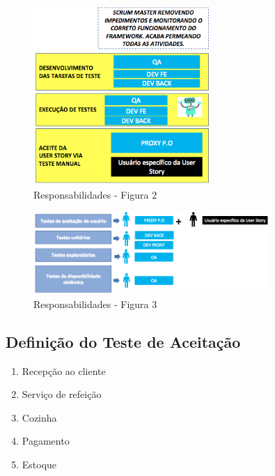 \begin{figure}[H]
  \centering
  \includegraphics[width=0.6\textwidth]{softwareengineer/images/responsibilities-2} 
  \caption{Responsabilidades - Figura 2}
  \label{fig:responsibilities-2} 
\end{figure}

\begin{figure}[H]
  \centering
  \includegraphics[width=0.8\textwidth]{softwareengineer/images/responsibilities-3} 
  \caption{Responsabilidades - Figura 3}
  \label{fig:responsibilities-3} 
\end{figure}






\subsection{Definição do Teste de Aceitação}

\begin{enumerate}
  \item Recepção ao cliente
  \item Serviço de refeição
  \item Cozinha
  \item Pagamento
  \item Estoque
\end{enumerate}

